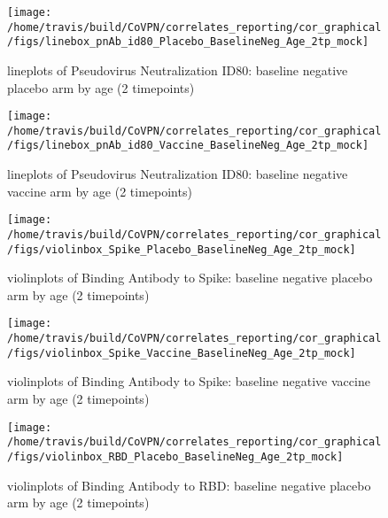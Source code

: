 \documentclass[]{book}
\theoremstyle{definition}
\theoremstyle{definition}
\theoremstyle{definition}
\newcommand{\1}{\mathbbm{1}}
\begin{document}
\clearpage
\begin{figure}[H]

{\centering \texttt{[image: /home/travis/build/CoVPN/correlates\_reporting/cor\_graphical/figs/linebox\_pnAb\_id80\_Placebo\_BaselineNeg\_Age\_2tp\_mock]} 

}

\caption{lineplots of Pseudovirus Neutralization ID80: baseline negative placebo arm by age (2 timepoints)}\label{fig:unnamed-chunk-65}
\end{figure}

\clearpage
\begin{figure}[H]

{\centering \texttt{[image: /home/travis/build/CoVPN/correlates\_reporting/cor\_graphical/figs/linebox\_pnAb\_id80\_Vaccine\_BaselineNeg\_Age\_2tp\_mock]} 

}

\caption{lineplots of Pseudovirus Neutralization ID80: baseline negative vaccine arm by age (2 timepoints)}\label{fig:unnamed-chunk-66}
\end{figure}

\clearpage
\begin{figure}[H]

{\centering \texttt{[image: /home/travis/build/CoVPN/correlates\_reporting/cor\_graphical/figs/violinbox\_Spike\_Placebo\_BaselineNeg\_Age\_2tp\_mock]} 

}

\caption{violinplots of Binding Antibody to Spike: baseline negative placebo arm by age (2 timepoints)}\label{fig:unnamed-chunk-67}
\end{figure}

\clearpage
\begin{figure}[H]

{\centering \texttt{[image: /home/travis/build/CoVPN/correlates\_reporting/cor\_graphical/figs/violinbox\_Spike\_Vaccine\_BaselineNeg\_Age\_2tp\_mock]} 

}

\caption{violinplots of Binding Antibody to Spike: baseline negative vaccine arm by age (2 timepoints)}\label{fig:unnamed-chunk-68}
\end{figure}

\clearpage
\begin{figure}[H]

{\centering \texttt{[image: /home/travis/build/CoVPN/correlates\_reporting/cor\_graphical/figs/violinbox\_RBD\_Placebo\_BaselineNeg\_Age\_2tp\_mock]} 

}

\caption{violinplots of Binding Antibody to RBD: baseline negative placebo arm by age (2 timepoints)}\label{fig:unnamed-chunk-69}
\end{figure}
\end{document}
